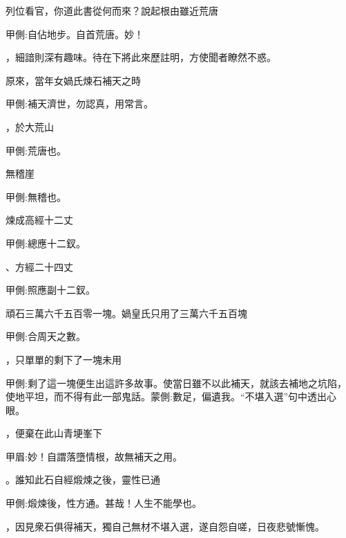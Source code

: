 \begin{parag}
    列位看官，你道此書從何而來？說起根由雖近荒唐
    \begin{note}甲側:自佔地步。自首荒唐。妙！\end{note}，細諳則深有趣味。待在下將此來歷註明，方使聞者瞭然不惑。

\end{parag}


\begin{parag}
    原來，當年女媧氏煉石補天之時\begin{note}甲側:補天濟世，勿認真，用常言。\end{note}，於大荒山\begin{note}甲側:荒唐也。\end{note}無稽崖\begin{note}甲側:無稽也。\end{note}煉成高經十二丈\begin{note}甲側:總應十二釵。\end{note}、方經二十四丈\begin{note}甲側:照應副十二釵。\end{note}頑石三萬六千五百零一塊。媧皇氏只用了三萬六千五百塊\begin{note}甲側:合周天之數。\end{note}，只單單的剩下了一塊未用\begin{note}甲側:剩了這一塊便生出這許多故事。使當日雖不以此補天，就該去補地之坑陷，使地平坦，而不得有此一部鬼話。蒙側:數足，偏遺我。“不堪入選”句中透出心眼。\end{note}，便棄在此山青埂峯下\begin{note}甲眉:妙！自謂落墮情根，故無補天之用。\end{note}。誰知此石自經煅煉之後，靈性已通\begin{note}甲側:煅煉後，性方通。甚哉！人生不能學也。\end{note}，因見衆石俱得補天，獨自己無材不堪入選，遂自怨自嗟，日夜悲號慚愧。

\end{parag}


